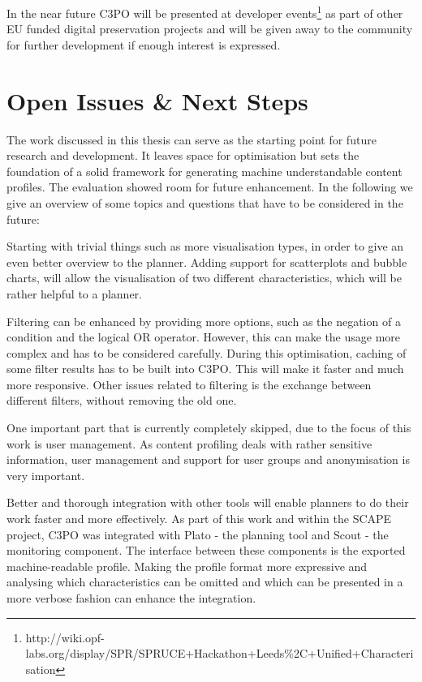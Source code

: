 In the near future C3PO will be presented at developer events\footnote{http://wiki.opf-labs.org/display/SPR/SPRUCE+Hackathon+Leeds\%2C+Unified+Characterisation} as part of other EU funded digital preservation projects and will be given away to the community for further development if enough interest is expressed.

% 

\section{Open Issues \& Next Steps}
The work discussed in this thesis can serve as the starting point for future research and development.
It leaves space for optimisation but sets the foundation of a solid framework for generating machine understandable content profiles. The evaluation showed room for future enhancement. In the following we give an overview of some topics and questions that have to be considered in the future:

Starting with trivial things such as more visualisation types, in order to give an even better overview to the planner. Adding support for scatterplots and bubble charts, will allow the visualisation of two different characteristics, which will be rather helpful to a planner.

Filtering can be enhanced by providing more options, such as the negation of a condition and the logical OR operator. However, this can make the usage more complex and has to be considered carefully. During this optimisation, caching of some filter results has to be built into C3PO. This will make it faster and much more responsive.
Other issues related to filtering is the exchange between different filters, without removing the old one.

One important part that is currently completely skipped, due to the focus of this work is user management. As content profiling deals with rather sensitive information, user management and support for user groups and anonymisation is very important.

Better and thorough integration with other tools will enable planners to do their work faster and more effectively. As part of this work and within the SCAPE project, C3PO was integrated with Plato - the planning tool and Scout - the monitoring component. The interface between these components is the exported machine-readable profile. Making the profile format more expressive and analysing which characteristics can be omitted and which can be presented in a more verbose fashion can enhance the integration.

